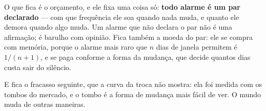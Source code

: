 O que fica é o orçamento, e ele fixa uma coisa só: \textbf{todo alarme é um par declarado} ---
com que frequência ele soa quando nada muda, e quanto ele demora quando algo muda. Um alarme que não declara o par não é uma afirmação; é barulho com opinião. Fica também
a moeda do par: ele se compra com memória, porque o alarme mais raro que $n$ dias de janela
permitem é $1/(n+1)$, e se paga conforme a forma da mudança, que decide quantos dias custa
sair do silêncio.

E fica o fracasso seguinte, que a curva da troca não mostra: ela foi medida com os tombos do
mercado, e o tombo é a forma de mudança mais fácil de ver. O mundo muda de outras maneiras.
